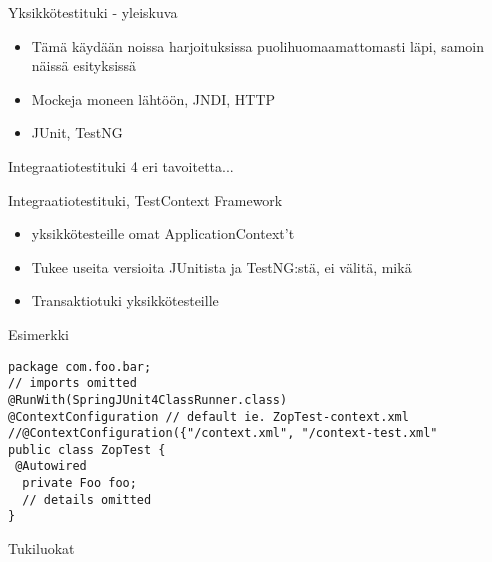 \documentclass[hyperref={pdfauthor=\AUTHOR},14pt]{beamer}
\author{\AUTHOR}
\title[\TITLE]{\TITLE}
\date{\DATE}
\begin{document}
\begin{frame}[plain]
\titlepage
\end{frame}

\begin{frame}{Yksikkötestituki - yleiskuva}

\begin{itemize}
\item Tämä käydään noissa harjoituksissa puolihuomaamattomasti läpi, samoin näissä esityksissä
\item Mockeja moneen lähtöön, JNDI, HTTP
\item JUnit, TestNG
\end{itemize}
\end{frame}

\begin{frame}{Integraatiotestituki}
4 eri tavoitetta...

\end{frame}

\begin{frame}{Integraatiotestituki, TestContext Framework}
\begin{itemize}
\item yksikkötesteille omat ApplicationContext't
\item Tukee useita versioita JUnitista ja TestNG:stä, ei välitä, mikä 
\item Transaktiotuki yksikkötesteille
\end{itemize}
\end{frame}

\begin{frame}[t, fragile]{Esimerkki}
\begin{lstlisting}[style=Java]
package com.foo.bar;
// imports omitted
@RunWith(SpringJUnit4ClassRunner.class)
@ContextConfiguration // default ie. ZopTest-context.xml
//@ContextConfiguration({"/context.xml", "/context-test.xml"
public class ZopTest {
 @Autowired
  private Foo foo;
  // details omitted
}
\end{lstlisting}
\end{frame}

\begin{frame}[t, fragile]{Tukiluokat}
\end{frame}
\end{document}
